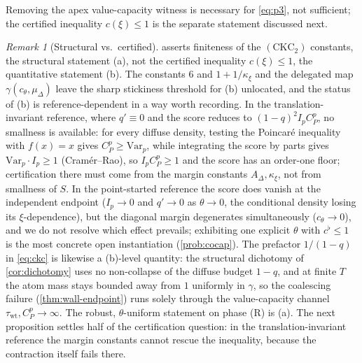 \documentclass[reqno,final,11pt]{amsart}
\theoremstyle{plain}
\theoremstyle{definition}
\theoremstyle{remark}
\newtheorem{remark}[theorem]{Remark}
\newcommand{\muD}{\mu_{\Delta}}
\newcommand{\cth}{c_{\theta}}
\newcommand{\CKC}{(\mathrm{CKC}_{2})}
\begin{document}
Removing the apex value-capacity witness is necessary for \eqref{eq:p3}, not
sufficient; the certified inequality $c(\xi)\le1$ is the separate statement
discussed next.

\begin{remark}[Structural vs.\ certified]\label{rem:struct-vs-cert}
 asserts finiteness of the $\CKC$ constants, the
structural statement (a), not the certified inequality $c(\xi)\le1$, the
quantitative statement (b). The constants $6$ and $1+1/\kappa_\xi$ and the
delegated map $\gamma(\cth,\muD)$ leave the sharp stickiness threshold for (b)
unlocated, and the status of (b) is reference-dependent in a way worth
recording. In the translation-invariant reference, where $q'\equiv0$ and the
score reduces to $(1-q)^2I_pC^p_P$, no smallness is available: for every
diffuse density, testing the Poincar\'e inequality with $f(x)=x$ gives
$C^p_P\ge\mathrm{Var}_p$, while integrating the score by parts gives
$\mathrm{Var}_p\cdot I_p\ge1$ (Cram\'er--Rao), so $I_pC^p_P\ge1$ and the score
has an order-one floor; certification there must come from the margin
constants $A_\Delta,\kappa_\xi$, not from smallness of $S$. In the
point-started reference the score does vanish at the independent endpoint
($I_p\to0$ and $q'\to0$ as $\theta\to0$, the conditional density losing its
$\xi$-dependence), but the diagonal margin degenerates simultaneously
($c_\theta\to0$), and we do not resolve which effect prevails; exhibiting one
explicit $\theta$ with $c^{\flat}\le1$ is the most concrete open instantiation
(\cref{prob:cocap}). The prefactor $1/(1-q)$ in \eqref{eq:ckc}
is likewise a (b)-level quantity: the structural dichotomy of \cref{cor:dichotomy}
uses no non-collapse of the diffuse budget $1-q$, and at finite $T$ the atom mass
stays bounded away from $1$ uniformly in $\gamma$, so the coalescing failure
(\cref{thm:wall-endpoint}) runs solely through the value-capacity channel
$\tau_{\mathrm{wt}},C^p_P\to\infty$. The robust, $\theta$-uniform statement on
phase (R) is (a). The next proposition settles half of the certification
question: in the translation-invariant reference the margin constants cannot
rescue the inequality, because the contraction itself fails there.
\end{remark}
\end{document}
